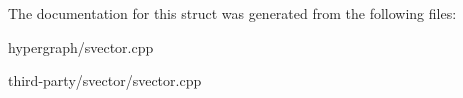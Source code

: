 The documentation for this struct was generated from the following files:\begin{DoxyCompactItemize}
\item 
hypergraph/svector.cpp\item 
third-\/party/svector/svector.cpp\end{DoxyCompactItemize}
